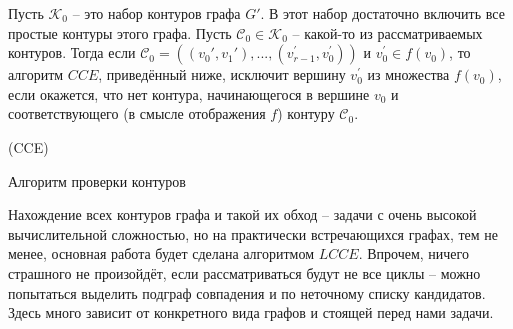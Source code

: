 Пусть $\mathcal{K}_0$ -- это набор контуров графа $G'$. В этот набор достаточно включить все простые контуры этого графа. 
Пусть $\mathcal{C}_0 \in \mathcal{K}_0$ -- какой-то из рассматриваемых контуров. Тогда если $\mathcal{C}_0 = ((v_0', v_1'), ..., (v_{r-1}^{\prime}, v_0^{\prime}))$ и $v_0^{\prime} \in f(v_0)$, то алгоритм $CCE$, приведённый ниже, исключит вершину $v_0^{\prime}$ из множества $f(v_0)$, если окажется, что нет контура, начинающегося в вершине $v_0$ и соответствующего (в смысле отображения $f$) контуру $\mathcal{C}_0$.

\begin{algorithm}[H]
	\Large
	\Begin(CCE){
	}

	\caption{Алгоритм проверки контуров}
	\label{alg:CCE}
\end{algorithm}

Нахождение всех контуров графа и такой их обход -- задачи с очень высокой вычислительной сложностью, но на практически встречающихся графах, тем не менее, основная работа будет сделана алгоритмом $LCCE$. Впрочем, ничего страшного не произойдёт, если рассматриваться будут не все циклы -- можно попытаться выделить подграф совпадения и по неточному списку кандидатов. Здесь много зависит от конкретного вида графов и стоящей перед нами задачи.

